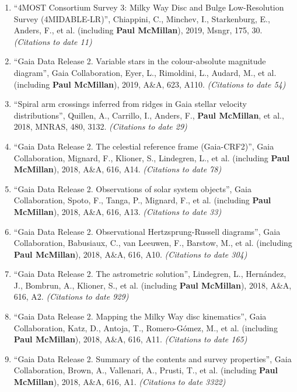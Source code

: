 \documentclass{resume}
\begin{document}
\begin{enumerate}
\item ``4MOST Consortium Survey 3: Milky Way Disc and Bulge Low-Resolution Survey (4MIDABLE-LR)'', Chiappini, C., Minchev, I., Starkenburg, E., Anders, F., et al. (including \textbf{Paul McMillan}), 2019, Msngr, 175, 30. \textit{(Citations to date 11)}

\item ``Gaia Data Release 2. Variable stars in the colour-absolute magnitude diagram'', Gaia Collaboration, Eyer, L., Rimoldini, L., Audard, M., et al. (including \textbf{Paul McMillan}), 2019, A\&A, 623, A110. \textit{(Citations to date 54)}

\item ``Spiral arm crossings inferred from ridges in Gaia stellar velocity distributions'', Quillen, A., Carrillo, I., Anders, F., \textbf{Paul McMillan}, et al., 2018, MNRAS, 480, 3132. \textit{(Citations to date 29)}

\item ``Gaia Data Release 2. The celestial reference frame (Gaia-CRF2)'', Gaia Collaboration, Mignard, F., Klioner, S., Lindegren, L., et al. (including \textbf{Paul McMillan}), 2018, A\&A, 616, A14. \textit{(Citations to date 78)}

\item ``Gaia Data Release 2. Observations of solar system objects'', Gaia Collaboration, Spoto, F., Tanga, P., Mignard, F., et al. (including \textbf{Paul McMillan}), 2018, A\&A, 616, A13. \textit{(Citations to date 33)}

\item ``Gaia Data Release 2. Observational Hertzsprung-Russell diagrams'', Gaia Collaboration, Babusiaux, C., van Leeuwen, F., Barstow, M., et al. (including \textbf{Paul McMillan}), 2018, A\&A, 616, A10. \textit{(Citations to date 304)}

\item ``Gaia Data Release 2. The astrometric solution'', Lindegren, L., Hern\'andez, J., Bombrun, A., Klioner, S., et al. (including \textbf{Paul McMillan}), 2018, A\&A, 616, A2. \textit{(Citations to date 929)}

\item ``Gaia Data Release 2. Mapping the Milky Way disc kinematics'', Gaia Collaboration, Katz, D., Antoja, T., Romero-G\'omez, M., et al. (including \textbf{Paul McMillan}), 2018, A\&A, 616, A11. \textit{(Citations to date 165)}

\item ``Gaia Data Release 2. Summary of the contents and survey properties'', Gaia Collaboration, Brown, A., Vallenari, A., Prusti, T., et al. (including \textbf{Paul McMillan}), 2018, A\&A, 616, A1. \textit{(Citations to date 3322)}


\end{enumerate}
\end{document}
